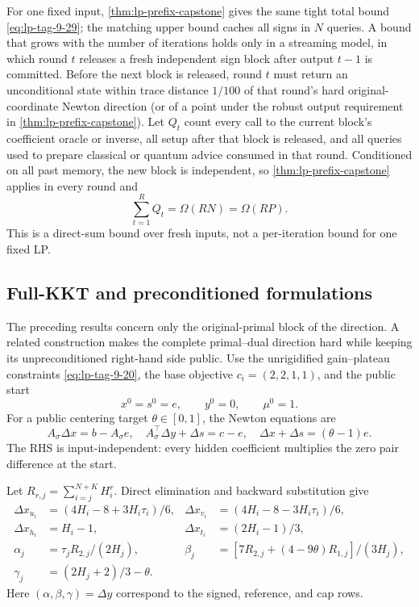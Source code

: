 For one fixed input, \cref{thm:lp-prefix-capstone} gives the same tight
total bound \eqref{eq:lp-tag-9-29}; the matching upper bound caches all signs
in \(N\) queries.  A bound that grows with the number of iterations holds only
in a streaming model, in which round \(t\) releases a fresh independent sign
block after output \(t-1\) is committed.  Before the next
block is released, round \(t\) must return an unconditional state within
trace distance \(1/100\) of that round's hard original-coordinate Newton
direction (or of a point under the robust output requirement in
\cref{thm:lp-prefix-capstone}).  Let \(Q_t\) count every call to the current
block's coefficient oracle or inverse, all setup after that block is
released, and all queries used to prepare classical or quantum advice
consumed in that round.  Conditioned on all past memory, the new block is
independent, so \cref{thm:lp-prefix-capstone} applies in every round and
\begin{equation}
 \sum_{t=1}^RQ_t=\Omega(RN)=\Omega(RP).
\end{equation}
This is a direct-sum bound over fresh inputs, not a per-iteration bound for
one fixed LP.

\subsection{Full-KKT and preconditioned formulations}
\label{sec:lp-full-kkt}

The preceding results concern only the original-primal block of the
direction.  A related
construction makes the complete primal--dual direction hard while keeping its
unpreconditioned right-hand side public.  Use the unrigidified gain--plateau
constraints \eqref{eq:lp-tag-9-20}, the base objective \(c_i=(2,2,1,1)\), and the public start
\begin{equation}
 x^0=s^0=e,\qquad y^0=0,\qquad \mu^0=1.
\end{equation}
For a public centering target \(\theta\in[0,1]\), the Newton equations are
\begin{equation}
 A_\sigma\Delta x=b-A_\sigma e,\quad
 A_\sigma^\top\Delta y+\Delta s=c-e,\quad
 \Delta x+\Delta s=(\theta-1)e.
\label{eq:lp-tag-9-62}
\end{equation}
The RHS is input-independent: every hidden coefficient multiplies the zero
pair difference at the start.

Let \(R_{r,j}=\sum_{i=j}^{N+K}H_i^r\).  Direct elimination and backward
substitution give
\begin{equation}
\begin{aligned}
 \Delta x_{u_i}&=(4H_i-8+3H_i\tau_i)/6,&
 \Delta x_{v_i}&=(4H_i-8-3H_i\tau_i)/6,\\
 \Delta x_{h_i}&=H_i-1,&
 \Delta x_{t_i}&=(2H_i-1)/3,\\
 \alpha_j&=\tau_jR_{2,j}/(2H_j),&
 \beta_j&=[7R_{2,j}+(4-9\theta)R_{1,j}]/(3H_j),\\
 \gamma_j&=(2H_j+2)/3-\theta .
\end{aligned}
\label{eq:lp-tag-9-63}
\end{equation}
Here \((\alpha,\beta,\gamma)=\Delta y\) correspond to the signed,
reference, and cap rows.

